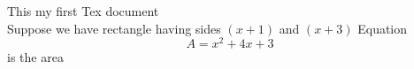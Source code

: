 \documentclass[11]{article}
\begin{document}
This my first Tex document\\
Suppose we have rectangle having sides $(x+1)$ and $(x+3)$
Equation $$A=x^2+4x+3$$ is the area
\end{document}
